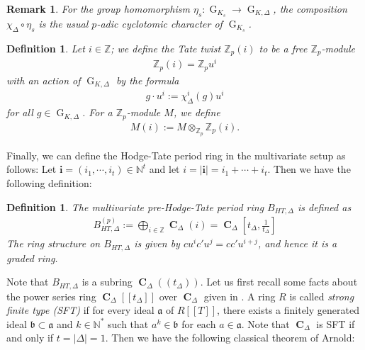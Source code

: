\documentclass{amsart}
\newtheorem{remark}[proposition]{Remark}
\newtheorem{definition}[proposition]{Definition}
\newcommand{\bi}{\textbf{i}}
\DeclareMathOperator{\C}{\textbf{C}}
\newcommand{\mBHT}{B_{HT,\Delta}}
\newcommand{\pmBHT}{B^{(p)}_{HT,\Delta}}
\DeclareMathOperator{\G}{G}
\begin{document}
\begin{remark}
    For the group homomorphism $\eta_s:\G_{K_s}\to\G_{K,\Delta}$, the composition $\chi_\Delta\circ\eta_s$ is the usual $p$-adic cyclotomic character of $\G_{K_s}$.
\end{remark}

\begin{definition}
    Let $i\in\mathbb{Z}$; we define the \emph{Tate twist} $\mathbb{Z}_p(i)$ to be a free $\mathbb{Z}_p$-module
    \begin{align*}
      \mathbb{Z}_p(i)=\mathbb{Z}_pu^i
    \end{align*}
    with an action of $\G_{K,\Delta}$ by the formula
    \begin{align*}
        g\cdot u^i:=\chi^i_\Delta(g)u^i
    \end{align*}
    for all $g\in\G_{K,\Delta}$. For a $\mathbb{Z}_p$-module $M$, we define
    \begin{align*}
        M(i):=M\otimes_{\mathbb{Z}_p}\mathbb{Z}_p(i).
    \end{align*}
\end{definition}

Finally, we can define the Hodge-Tate period ring in the multivariate setup as follows: Let $\bi=(i_1,\cdots,i_t)\in\mathbb{N}^t$ and let $i=|\bi|=i_1+\cdots+i_t$. Then we have the following definition:

\begin{definition}\label{Pre-Hodge Tate Period Rings}
    The \emph{multivariate pre-Hodge-Tate period ring} $\mBHT$ is defined as
    \begin{align*}
        \pmBHT:=\bigoplus\limits_{i\in\mathbb{Z}}\C_\Delta(i)=\C_\Delta\left[t_\Delta,\frac{1}{t_\Delta}\right]
    \end{align*}
    The ring structure on $\mBHT$ is given by $cu^ic'u^j=cc'u^{i+j}$, and hence it is a graded ring.
\end{definition}

Note that $\mBHT$ is a subring $\C_\Delta(\!(t_\Delta)\!)$. Let us first recall some facts about the power series ring $\C_\Delta[\![t_\Delta]\!]$ over $\C_\Delta$ given in \cite{Powerseriesdim}. A ring $R$ is called \emph{strong finite type (SFT)} if for every ideal $\mathfrak{a}$ of $R[\![T]\!]$, there exists a finitely generated ideal $\mathfrak{b}\subset\mathfrak{a}$ and $k\in\mathbb{N}^*$ such that $a^k\in\mathfrak{b}$ for each $a\in\mathfrak{a}$. Note that $\C_\Delta$ is SFT if and only if $t=|\Delta|=1$. Then we have the following classical theorem of Arnold:
\end{document}

